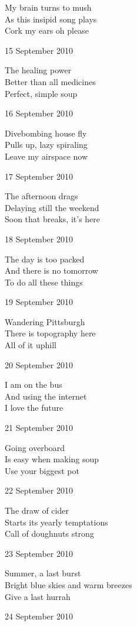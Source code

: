 \documentclass[12pt]{article}
\begin{document}
My brain turns to mush \\
As this insipid song plays \\
Cork my ears oh please

15 September 2010

The healing power \\
Better than all medicines \\
Perfect, simple soup

16 September 2010

Divebombing house fly \\
Pulls up, lazy spiraling \\
Leave my airspace now

\newpage

17 September 2010

The afternoon drags \\
Delaying still the weekend \\
Soon that breaks, it's here

18 September 2010

The day is too packed \\
And there is no tomorrow \\
To do all these things

19 September 2010

Wandering Pittsburgh \\
There is topography here \\
All of it uphill

20 September 2010

I am on the bus \\
And using the internet \\
I love the future

21 September 2010

Going overboard \\
Is easy when making soup \\
Use your biggest pot

22 September 2010

The draw of cider \\
Starts its yearly temptations \\
Call of doughnuts strong

23 September 2010

Summer, a last burst \\
Bright blue skies and warm breezes \\
Give a last hurrah

\newpage

24 September 2010
\end{document}

